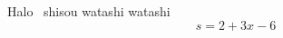 \documentclass[12pt]{article}
\begin{document}
Halo \ shisou
watashi watashi 
$$s=2+3x-6$$\
\end{document}
